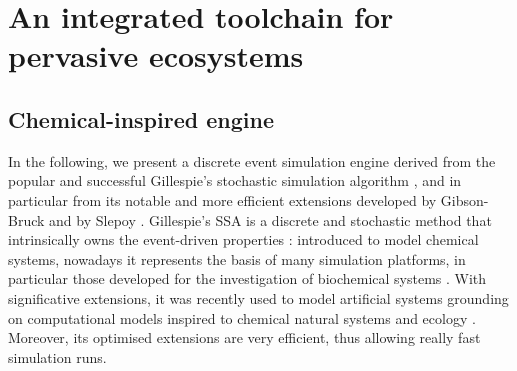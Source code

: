 \documentclass[12pt,a4paper,twoside,openright]{book}
\begin{document}
\part{An integrated toolchain for pervasive ecosystems}
\label{alchemist-part}

\chapter{Chemical-inspired engine}
\label{chemical-engine}
In the following, we present a discrete event simulation engine derived from the popular and successful Gillespie's stochastic simulation algorithm \cite{gillespie1977}, and in particular from its notable and more efficient extensions developed by Gibson-Bruck \cite{gibson2000} and by Slepoy \cite{slepoy2008}.   
%
Gillespie's SSA is a discrete and stochastic method that intrinsically owns the event-driven properties \cite{spatialeventgillespie}: introduced to model chemical systems, nowadays it represents the basis of many simulation platforms, in particular those developed for the investigation of biochemical systems \cite{Priami:2001,Kierzek01032002,CiocchettaH09,versari08,montagna-cs2bio10,btssoc-jos7,Hoops15122006}. 
%
With significative extensions, it was recently used to model artificial systems grounding on computational models inspired to chemical natural systems and ecology \cite{Montagna-MONET2012}.
%
Moreover, its optimised extensions \cite{gibson2000,slepoy2008} are very efficient, thus allowing really fast simulation runs.

\end{document}
